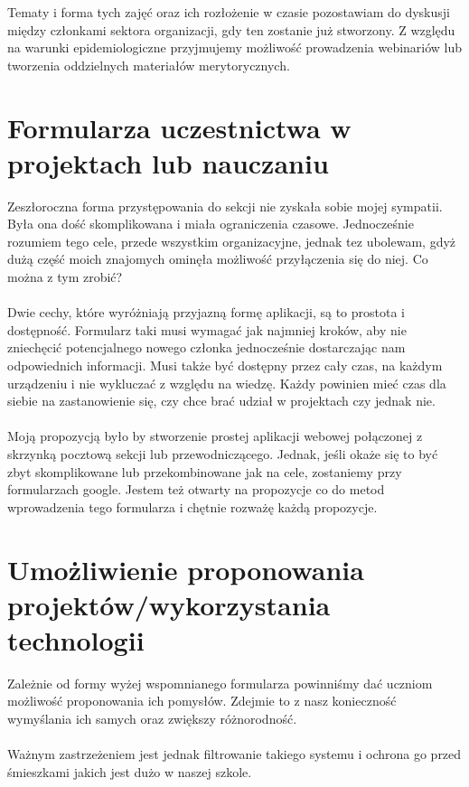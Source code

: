 \documentclass[9pt,a4paper]{report}
\begin{document}
Tematy i forma tych zajęć oraz ich rozłożenie w czasie pozostawiam do dyskusji między członkami sektora organizacji, gdy ten zostanie już stworzony. Z względu na warunki epidemiologiczne przyjmujemy możliwość prowadzenia webinariów lub tworzenia oddzielnych materiałów merytorycznych. 

\section{Formularza uczestnictwa w projektach lub nauczaniu} 

Zeszłoroczna forma przystępowania do sekcji nie zyskała sobie mojej sympatii. Była ona dość skomplikowana i miała ograniczenia czasowe. Jednocześnie rozumiem tego cele, przede wszystkim organizacyjne, jednak tez ubolewam, gdyż dużą część moich znajomych ominęła możliwość przyłączenia się do niej. Co można z tym zrobić?\\\\ 

Dwie cechy, które wyróżniają przyjazną formę aplikacji, są to prostota i dostępność. Formularz taki musi wymagać jak najmniej kroków, aby nie zniechęcić potencjalnego nowego członka jednocześnie dostarczając nam odpowiednich informacji. Musi także być dostępny przez cały czas, na każdym urządzeniu i nie wykluczać z względu na wiedzę. Każdy powinien mieć czas dla siebie na zastanowienie się, czy chce brać udział w projektach czy jednak nie.\\\\ 

Moją propozycją było by stworzenie prostej aplikacji webowej połączonej z skrzynką pocztową sekcji lub przewodniczącego. Jednak, jeśli okaże się to być zbyt skomplikowane lub przekombinowane jak na cele, zostaniemy przy formularzach google. Jestem też otwarty na propozycje co do metod wprowadzenia tego formularza i chętnie rozważę każdą propozycje. 

\section{Umożliwienie proponowania projektów/wykorzystania technologii} 

Zależnie od formy wyżej wspomnianego formularza powinniśmy dać uczniom możliwość proponowania ich pomysłów. Zdejmie to z nasz konieczność wymyślania ich samych oraz zwiększy różnorodność.\\\\ 

Ważnym zastrzeżeniem jest jednak filtrowanie takiego systemu i ochrona go przed śmieszkami jakich jest dużo w naszej szkole. 
\end{document}
